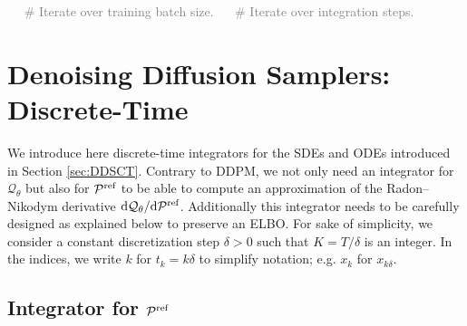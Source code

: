 \documentclass{article} %
\begin{document}
\begin{algorithm*}[t!]
\caption{DDS Training}\label{alg:dds_alg}
\begin{algorithmic}[1]
     \textcolor{gray}{ $\quad$ \# Iterate over training batch size.}
         \textcolor{gray}{ $\quad$ \# Iterate over integration steps.}
        \EndFor
    \EndFor    
\EndFor
{}
\end{algorithmic}
\end{algorithm*}

\section{Denoising Diffusion Samplers: Discrete-Time}\label{sec:DDSDT}
We introduce here discrete-time integrators for the SDEs and ODEs introduced in Section \ref{sec:DDSCT}. Contrary to DDPM, we not only need an integrator for $\mathcal{Q}_{\theta}$ but also for $\mathcal{P}^{\textup{ref}}$ to be able to compute an approximation of the Radon--Nikodym derivative $\mathrm{d}\mathcal{Q}_{\theta}/\mathrm{d}\mathcal{P}^{\textup{ref}}$. Additionally this integrator needs to be carefully designed as explained below to preserve an ELBO. For sake of simplicity, we consider a constant discretization step $\delta\!>\!0$ such that $K\!=T/\delta$ is an integer. In the indices, we write $k$ for $t_k=k\delta$ to simplify notation; e.g. $x_k$ for $x_{k\delta}$.

\subsection{Integrator for ${\mathcal{P}}^{\mathrm{ref}}$}
\end{document}
